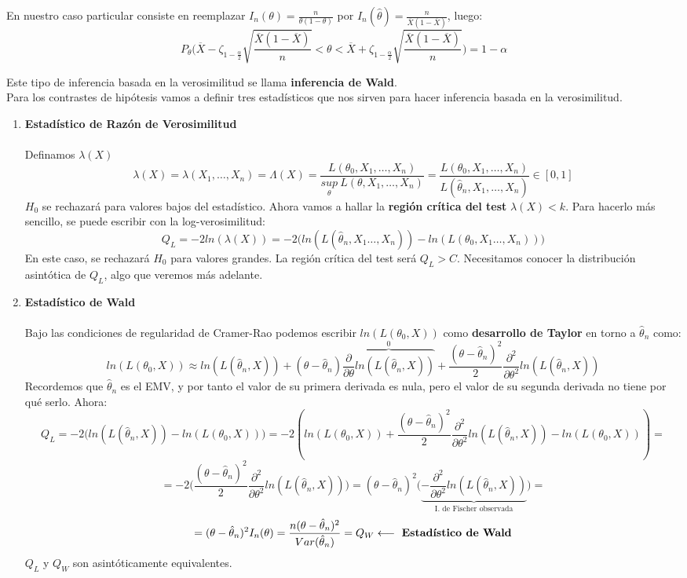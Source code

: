 \noindent En nuestro caso particular consiste en reemplazar $I_n(\theta)=\frac{n}{\theta(1-\theta)}$ por $I_n(\hat\theta)=\frac{n}{\overline{X}(1-\overline{X})}$, luego:
$$P_\theta\Bigg(\overline{X}-\zeta_{1-\frac{\alpha}{2}}\sqrt{\frac{\overline{X}(1-\overline{X})}{n}}<\theta<\overline{X}+\zeta_{1-\frac{\alpha}{2}}\sqrt{\frac{\overline{X}(1-\overline{X})}{n}}\Bigg)=1-\alpha$$

Este tipo de inferencia basada en la verosimilitud se llama \textbf{inferencia de Wald}.\\

Para los contrastes de hipótesis vamos a definir tres estadísticos que nos sirven para hacer inferencia basada en la verosimilitud.
\begin{enumerate}
    \item \textbf{Estadístico de Razón de Verosimilitud}\\\ \\
    Definamos $\lambda (X)$
    $$\lambda (X)=\lambda (X_1,\dots ,X_n)=\Lambda (X)=\frac{L(\theta_0, X_1,\dots,X_n)}{\underset{\theta}{sup}\ L(\theta,X_1,\dots,X_n)}=\frac{L(\theta_0, X_1,\dots,X_n)}{L(\hat\theta_n, X_1,\dots,X_n)}\in [0,1]$$
    $H_0$ se rechazará para valores bajos del estadístico. 
    Ahora vamos a hallar la \textbf{región crítica del test} $\lambda (X)<k$. Para hacerlo más sencillo, se puede escribir con la log-verosimilitud:
    $$Q_L=-2ln(\lambda (X))=-2\big(ln(L(\hat\theta_n,X_1\dots,X_n))-ln(L(\theta_0,X_1\dots,X_n))\big)$$
    En este caso, se rechazará $H_0$ para valores grandes. La región crítica del test será $Q_L>C$. 
    Necesitamos conocer la distribución asintótica de $Q_L$, algo que veremos más adelante.

    \item \textbf{Estadístico de Wald}\\\ \\
    Bajo las condiciones de regularidad de Cramer-Rao podemos escribir $ln(L(\theta_0,X))$ como \textbf{desarrollo de Taylor} en torno a $\hat\theta_n$ como:
    $$ln(L(\theta_0,X))\approx ln(L(\hat\theta_n,X))+(\theta-\hat\theta_n)\overbrace{\frac{\partial}{\partial\theta}ln(L(\hat\theta_n,X))}^{0}+\frac{(\theta-\hat\theta_n)^2}{2}\frac{\partial^2}{\partial\theta^2}ln(L(\hat\theta_n,X))$$
    Recordemos que $\hat\theta_n$ es el EMV, y por tanto el valor de su primera derivada es nula, pero el valor de su segunda derivada no tiene por qué serlo.
Ahora:
    $$Q_L=-2\big(ln(L(\hat\theta_n,X))-ln(L(\theta_0,X))\big)=-2(ln(L(\theta_0,X))+\frac{(\theta-\hat\theta_n)^2}{2}\frac{\partial^2}{\partial\theta^2}ln(L(\hat\theta_n,X))-ln(L(\theta_0,X)))=$$
    $$=-2\Big(\frac{(\theta-\hat\theta_n)^2}{2}\frac{\partial^2}{\partial\theta^2}ln(L(\hat\theta_n,X))\Big)=(\theta-\hat\theta_n)^2\Big(\underbrace{-\frac{\partial^2}{\partial\theta^2}ln(L(\hat\theta_n,X))}_{\text{I. de Fischer observada}}\Big)=$$
    $$=(\theta-\hat\theta_n)^2I_n(\theta)=\frac{n(\theta-\hat\theta_n)^2}{Var(\hat\theta_n)}=Q_W\longleftarrow\text{ \textbf{Estadístico de Wald}}$$
    $Q_L$ y $Q_W$ son asintóticamente equivalentes.


\end{enumerate}
